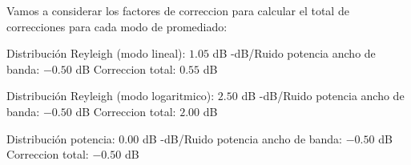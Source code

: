 \documentclass[a4paper,12pt,twoside]{article}
\begin{document}
Vamos a considerar los factores de correccion para calcular el total de correcciones para cada modo de promediado:
\newline

\newline
Distribución Reyleigh (modo lineal): $1.05$ dB -dB/Ruido potencia ancho de banda:  $-0.50$ dB \newline
Correccion total: $0.55$ dB
\newline

\newline
Distribución Reyleigh (modo logaritmico): $2.50$ dB -dB/Ruido potencia ancho de banda:  $-0.50$ dB \newline
Correccion total: $2.00$ dB
\newline
  
\newline
Distribución potencia: $0.00$ dB -dB/Ruido potencia ancho de banda:  $-0.50$ dB \newline
Correccion total: $-0.50$ dB
\end{document}
